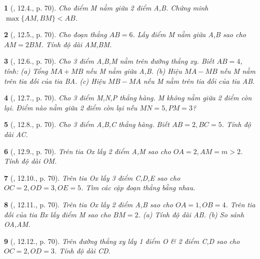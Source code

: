 \documentclass{article}
\newtheorem{baitoan}{}
\begin{document}
\begin{baitoan}[\cite{Binh_boi_duong_Toan_6_tap_2}, 12.4., p. 70]
	Cho điểm M nằm giữa 2 điểm A,B. Chứng minh $\max\{AM,BM\} < AB$.
\end{baitoan}

\begin{baitoan}[\cite{Binh_boi_duong_Toan_6_tap_2}, 12.5., p. 70]
	Cho đoạn thẳng $AB = 6$. Lấy điểm M nằm giữa A,B sao cho $AM = 2BM$. Tính độ dài AM,BM.
\end{baitoan}

\begin{baitoan}[\cite{Binh_boi_duong_Toan_6_tap_2}, 12.6., p. 70]
	Cho 3 điểm A,B,M nằm trên đường thẳng xy. Biết $AB = 4$, tính: (a) Tổng $MA + MB$ nếu M nằm giữa A,B. (b) Hiệu $MA - MB$ nếu M nằm trên tia đối của tia BA. (c) Hiệu $MB - MA$ nếu M nằm trên tia đối của tia AB.
\end{baitoan}

\begin{baitoan}[\cite{Binh_boi_duong_Toan_6_tap_2}, 12.7., p. 70]
	Cho 3 điểm M,N,P thẳng hàng. M không nằm giữa 2 điểm còn lại. Điểm nào nằm giữa 2 điểm còn lại nếu $MN = 5,PM = 3$?
\end{baitoan}

\begin{baitoan}[\cite{Binh_boi_duong_Toan_6_tap_2}, 12.8., p. 70]
	Cho 3 điểm A,B,C thẳng hàng. Biết $AB = 2,BC = 5$. Tính độ dài AC.
\end{baitoan}

\begin{baitoan}[\cite{Binh_boi_duong_Toan_6_tap_2}, 12.9., p. 70]
	Trên tia Ox lấy 2 điểm A,M sao cho $OA = 2,AM = m > 2$. Tính độ dài OM.
\end{baitoan}

\begin{baitoan}[\cite{Binh_boi_duong_Toan_6_tap_2}, 12.10., p. 70]
	Trên tia Ox lấy 3 điểm C,D,E sao cho $OC = 2,OD = 3,OE = 5$. Tìm các cặp đoạn thẳng bằng nhau.
\end{baitoan}

\begin{baitoan}[\cite{Binh_boi_duong_Toan_6_tap_2}, 12.11., p. 70]
	Trên tia Ox lấy 2 điểm A,B sao cho $OA = 1,OB = 4$. Trên tia đối của tia Bx lấy điểm M sao cho $BM = 2$. (a) Tính độ dài AB. (b) So sánh OA,AM.
\end{baitoan}

\begin{baitoan}[\cite{Binh_boi_duong_Toan_6_tap_2}, 12.12., p. 70]
	Trên đường thẳng xy lấy 1 điểm O \& 2 điểm C,D sao cho $OC = 2,OD = 3$. Tính độ dài CD.
\end{baitoan}
\end{document}

